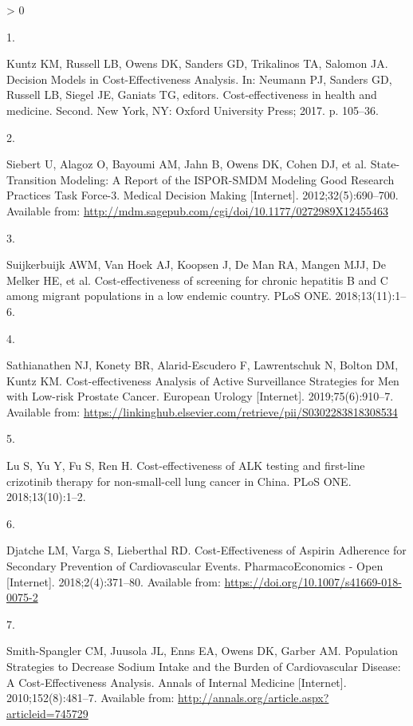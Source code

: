 \documentclass[
]{article}
\newlength{\cslhangindent}
\newlength{\csllabelwidth}
\newenvironment{CSLReferences}[2] %
 {%
  \setlength{\parindent}{0pt}
  \ifodd #1 \everypar{\setlength{\hangindent}{\cslhangindent}}\ignorespaces\fi
  \ifnum #2 > 0
  \setlength{\parskip}{#2\baselineskip}
  \fi
 }%
 {}
\newcommand{\CSLLeftMargin}[1]{\parbox[t]{\csllabelwidth}{#1}}
\newcommand{\CSLRightInline}[1]{\parbox[t]{\linewidth - \csllabelwidth}{#1}\break}
\begin{document}
\hypertarget{refs}{}
\begin{CSLReferences}{0}{0}
\leavevmode\hypertarget{ref-Kuntz2017}{}%
\CSLLeftMargin{1. }
\CSLRightInline{Kuntz KM, Russell LB, Owens DK, Sanders GD, Trikalinos TA, Salomon JA. {Decision Models in Cost-Effectiveness Analysis}. In: Neumann PJ, Sanders GD, Russell LB, Siegel JE, Ganiats TG, editors. Cost-effectiveness in health and medicine. Second. New York, NY: Oxford University Press; 2017. p. 105--36. }

\leavevmode\hypertarget{ref-Siebert2012c}{}%
\CSLLeftMargin{2. }
\CSLRightInline{Siebert U, Alagoz O, Bayoumi AM, Jahn B, Owens DK, Cohen DJ, et al. {State-Transition Modeling: A Report of the ISPOR-SMDM Modeling Good Research Practices Task Force-3}. Medical Decision Making {[}Internet{]}. 2012;32(5):690--700. Available from: \url{http://mdm.sagepub.com/cgi/doi/10.1177/0272989X12455463}}

\leavevmode\hypertarget{ref-Suijkerbuijk2018}{}%
\CSLLeftMargin{3. }
\CSLRightInline{Suijkerbuijk AWM, Van Hoek AJ, Koopsen J, De Man RA, Mangen MJJ, De Melker HE, et al. {Cost-effectiveness of screening for chronic hepatitis B and C among migrant populations in a low endemic country}. PLoS ONE. 2018;13(11):1--6. }

\leavevmode\hypertarget{ref-Sathianathen2018a}{}%
\CSLLeftMargin{4. }
\CSLRightInline{Sathianathen NJ, Konety BR, Alarid-Escudero F, Lawrentschuk N, Bolton DM, Kuntz KM. {Cost-effectiveness Analysis of Active Surveillance Strategies for Men with Low-risk Prostate Cancer}. European Urology {[}Internet{]}. 2019;75(6):910--7. Available from: \url{https://linkinghub.elsevier.com/retrieve/pii/S0302283818308534}}

\leavevmode\hypertarget{ref-Lu2018b}{}%
\CSLLeftMargin{5. }
\CSLRightInline{Lu S, Yu Y, Fu S, Ren H. {Cost-effectiveness of ALK testing and first-line crizotinib therapy for non-small-cell lung cancer in China}. PLoS ONE. 2018;13(10):1--2. }

\leavevmode\hypertarget{ref-Djatche2018}{}%
\CSLLeftMargin{6. }
\CSLRightInline{Djatche LM, Varga S, Lieberthal RD. {Cost-Effectiveness of Aspirin Adherence for Secondary Prevention of Cardiovascular Events}. PharmacoEconomics - Open {[}Internet{]}. 2018;2(4):371--80. Available from: \url{https://doi.org/10.1007/s41669-018-0075-2}}

\leavevmode\hypertarget{ref-Smith-Spangler2010}{}%
\CSLLeftMargin{7. }
\CSLRightInline{Smith-Spangler CM, Juusola JL, Enns EA, Owens DK, Garber AM. {Population Strategies to Decrease Sodium Intake and the Burden of Cardiovascular Disease: A Cost-Effectiveness Analysis}. Annals of Internal Medicine {[}Internet{]}. 2010;152(8):481--7. Available from: \url{http://annals.org/article.aspx?articleid=745729}}


\end{CSLReferences}
\end{document}
